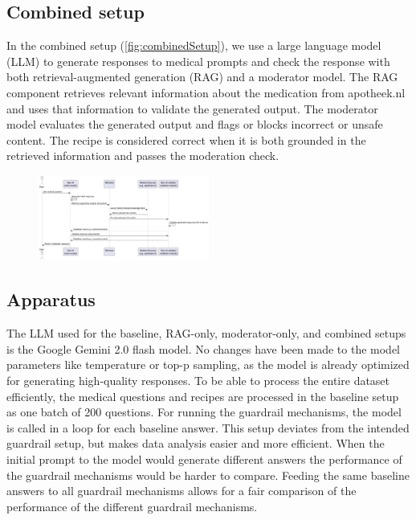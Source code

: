 \subsection{Combined setup}

In the combined setup (\autoref{fig:combinedSetup}), we use a large language model (LLM) to generate responses to medical prompts and check the response with both retrieval-augmented generation (RAG) and a moderator model.
The RAG component retrieves relevant information about the medication from apotheek.nl and uses that information to validate the generated output.
The moderator model evaluates the generated output and flags or blocks incorrect or unsafe content.
The recipe is considered correct when it is both grounded in the retrieved information and passes the moderation check.

\begin{figure}[H]
    \includegraphics[width=0.5\textwidth]{figures/combinedSetupSequenceDiagram.png}
    \label{fig:combinedSetup}
\end{figure}

\subsection{Apparatus}

The LLM used for the baseline, RAG-only, moderator-only, and combined setups is the Google Gemini 2.0 flash model.
No changes have been made to the model parameters like temperature or top-p sampling, as the model is already optimized for generating high-quality responses.
To be able to process the entire dataset efficiently, the medical questions and recipes are processed in the baseline setup as one batch of 200 questions.
For running the guardrail mechanisms, the model is called in a loop for each baseline answer.
This setup deviates from the intended guardrail setup, but makes data analysis easier and more efficient.
When the initial prompt to the model would generate different answers the performance of the guardrail mechanisms would be harder to compare.
Feeding the same baseline answers to all guardrail mechanisms allows for a fair comparison of the performance of the different guardrail mechanisms.

